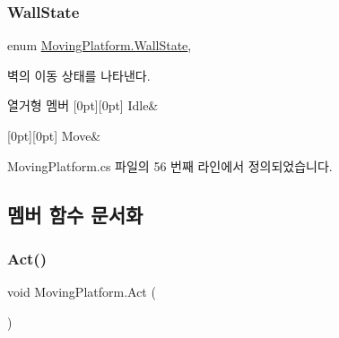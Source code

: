 \subsubsection{\texorpdfstring{WallState}{WallState}}
{\footnotesize\ttfamily enum \mbox{\hyperlink{class_moving_platform_ac47e764b71989317aab0bad26d82a901}{Moving\+Platform.\+Wall\+State}}\hspace{0.3cm}{\ttfamily [strong]}, {\ttfamily [private]}}



벽의 이동 상태를 나타낸다. 

\begin{DoxyEnumFields}{열거형 멤버}
[0pt][0pt]{}\mbox{\label{class_moving_platform_ac47e764b71989317aab0bad26d82a901ae599161956d626eda4cb0a5ffb85271c}} 
Idle&\\
\hline

[0pt][0pt]{}\mbox{\label{class_moving_platform_ac47e764b71989317aab0bad26d82a901a6bc362dbf494c61ea117fe3c71ca48a5}} 
Move&\\
\hline

\end{DoxyEnumFields}


Moving\+Platform.\+cs 파일의 56 번째 라인에서 정의되었습니다.


\begin{DoxyCode}{0}

\end{DoxyCode}


\subsection{멤버 함수 문서화}
\mbox{\label{class_moving_platform_ab4a3f15333f41ba4a3b9bc0227777460}} 
\subsubsection{\texorpdfstring{Act()}{Act()}}
{\footnotesize\ttfamily void Moving\+Platform.\+Act (\begin{DoxyParamCaption}{ }\end{DoxyParamCaption})\hspace{0.3cm}{\ttfamily [private]}}



